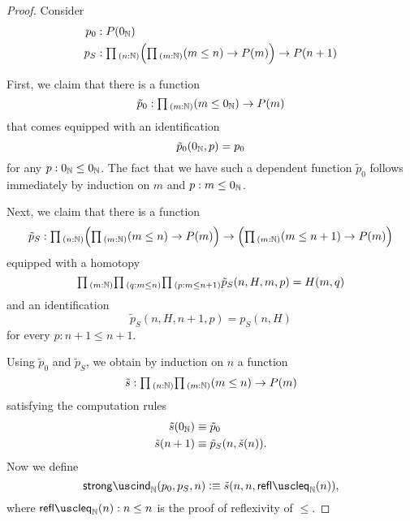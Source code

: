 \begin{proof}
  Consider
  \begin{align*}
    p_0 & : P(\zeroN) \\
    p_S & : \prd{n:\N}\Big(\prd{m:\N}(m\leq n)\to P(m)\Big)\to P(n+1)
  \end{align*}
  
  First, we claim that there is a function
  \begin{equation*}
    \tilde{p}_0 : \prd{m:\N}(m\leq\zeroN)\to P(m)
  \end{equation*}
  that comes equipped with an identification
  \begin{equation*}
    \tilde{p}_0(0_{{\mathbb{N}}},p)=p_0
  \end{equation*}
  for any $p:0_{{\mathbb{N}}}\leq0_{{\mathbb{N}}}$. The fact that we have such a dependent function $\tilde{p}_0$ follows immediately by induction on $m$ and $p:m\leq 0_{{\mathbb{N}}}$.

  Next, we claim that there is a function
  \begin{equation*}
    \tilde{p}_S : \prd{n:\N}\Big(\prd{m:\N}(m\leq n) \to P(m)\Big)\to \Big(\prd{m:\N}(m\leq n+1)\to P(m)\Big)
  \end{equation*}
  equipped with a homotopy
  \begin{equation*}
    \prd{m:\N}\prd{q:m\leq n}{p:m\leq n+1} \tilde{p}_S(n,H,m,p) = H(m,q)
  \end{equation*}
  and an identification
  \begin{equation*}
    \tilde{p}_S(n,H,n+1,p)=p_S(n,H)
  \end{equation*}
  for every $p:n+1\leq n+1$.

  Using $\tilde{p}_0$ and $\tilde{p}_S$, we obtain by induction on $n$ a function
  \begin{equation*}
    \tilde{s}:\prd{n:\N}\prd{m:\N} (m\leq n)\to P(m)
  \end{equation*}
  satisfying the computation rules
  \begin{align*}
    \tilde{s}(0_{{\mathbb{N}}}) & \equiv \tilde{p}_0 \\
    \tilde{s}(n+1) & \equiv \tilde{p}_S(n,\tilde{s}(n)).
  \end{align*}
  Now we define
  \begin{equation*}
    \strongindN(p_0,p_S,n) \defeq \tilde{s}(n,n,\reflleqN(n)),
  \end{equation*}
  where $\reflleqN(n):n\leq n$ is the proof of reflexivity of $\leq$.


\end{proof}
